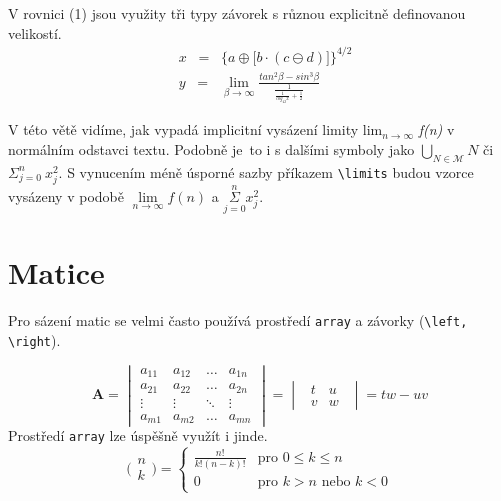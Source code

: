 \documentclass[a4paper, 11pt]{article}
\begin{document}
V rovnici (1) jsou využity tři typy závorek s různou explicitně definovanou velikostí.
\medskip
\begin{align}
    &x\;\;=\;\;\bigg\{a \oplus \Big[b \cdot (c \ominus d) \Big]\bigg\}^{4/2}\\
    &y\;\;=\;\;\lim_{\beta \to \infty} \frac{tan^2\beta - sin^3\beta}{\frac{1}{\frac{1}{log_{42} x} + \frac{1}{2}}}
\end{align}

V této větě vidíme, jak vypadá implicitní vysázení limity lim$_{n \to \infty}$ \emph{f(n)} v normálním odstavci textu. Podobně je~to i s dalšími symboly jako $\bigcup_{N\in \mathcal{M}}N$ či $\Sigma_{j=0}^n\:x_j^2$. S vynucením méně úsporné sazby příkazem \verb|\limits| budou vzorce vysázeny v podobě $\underset{n\to\infty}{\lim}f(n)$ a $\underset{j=0}{\overset{n}{\Sigma}} x_j^2$.

\section{Matice}
Pro sázení matic se velmi často používá prostředí \texttt{array}
a závorky (\verb|\left, \right|).

\[\mathbf{A} = \begin{vmatrix}
    a_{11} & a_{12} & \dots & a_{1n} \\
    a_{21} & a_{22} & \dots & a_{2n} \\
    \vdots & \vdots & \ddots & \vdots \\
    a_{m1} & a_{m2} & \dots & a_{mn}
\end{vmatrix} = \begin{vmatrix}
    \:\:t & u\:\:\\
    \:\:v & w\:\:
\end{vmatrix} = tw - uv \]
Prostředí \texttt{array} lze úspěšně využít i jinde.
\bigskip
\[
    \bigg(\!\!\begin{array}{c}n\\k\end{array}\!\!\bigg) = \left\{ \begin{array}{cl} \frac{n!}{k!(n-k)!} & \text{pro } 0 \leq k \leq n\\ 0 & \text{pro } k > n \text{ nebo } k < 0 \end{array} \right.
\]
\end{document}
